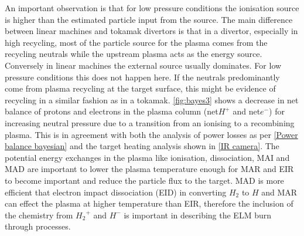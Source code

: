 An important observation is that for low pressure conditions the ionisation source is higher than the estimated particle input from the source. The main difference between linear machines and tokamak divertors is that in a divertor, especially in high recycling, most of the particle source for the plasma comes from the recycling neutrals while the upstream plasma acts as the energy source. Conversely in linear machines the external source usually dominates. For low pressure conditions this does not happen here. If the neutrals predominantly come from plasma recycling at the target surface, this might be evidence of recycling in a similar fashion as in a tokamak. %
\autoref{fig:bayes3} shows a decrease in net balance of protons and electrons in the plasma column (net$H^+$ and net$e^-$) for increasing neutral pressure due to a transition from an ionising to a recombining plasma. This is in agreement with both the analysis of power losses as per \autoref{Power balance bayesian} and the target heating analysis shown in \autoref{IR camera}. The potential energy exchanges in the plasma like ionisation, dissociation, MAI and MAD are important to lower the plasma temperature enough for MAR and EIR to become important and reduce the particle flux to the target. MAD is more efficient that electron impact dissociation (EID) in converting $H_2$ to $H$ and MAR can effect the plasma at higher temperature than EIR, therefore the inclusion of the chemistry from ${H_2}^+$ and $H^-$ is important in describing the ELM burn through processes.

